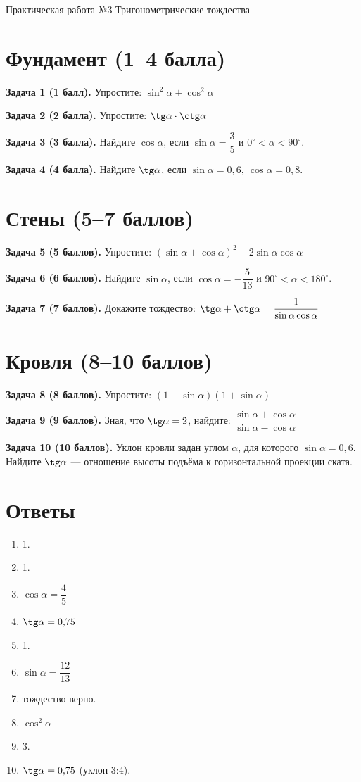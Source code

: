 \documentclass{umk-matematika}
\begin{document}
\maketitlepage
    {Практическая работа №3}
    {Тригонометрические тождества}
    {}

\section{Фундамент (1--4 балла)}

\textbf{Задача 1 (1 балл).} Упростите: $\sin^2 \alpha + \cos^2 \alpha$

\textbf{Задача 2 (2 балла).} Упростите: $\tg \alpha \cdot \ctg \alpha$

\textbf{Задача 3 (3 балла).} Найдите $\cos \alpha$, если $\sin \alpha = \dfrac{3}{5}$ и $0^\circ < \alpha < 90^\circ$.

\textbf{Задача 4 (4 балла).} Найдите $\tg \alpha$, если $\sin \alpha = 0{,}6,\ \cos \alpha = 0{,}8$.

\section{Стены (5--7 баллов)}

\textbf{Задача 5 (5 баллов).} Упростите: $(\sin \alpha + \cos \alpha)^2 - 2\sin \alpha \cos \alpha$

\textbf{Задача 6 (6 баллов).} Найдите $\sin \alpha$, если $\cos \alpha = -\dfrac{5}{13}$ и $90^\circ < \alpha < 180^\circ$.

\textbf{Задача 7 (7 баллов).} Докажите тождество: $\tg \alpha + \ctg \alpha = \dfrac{1}{\sin \alpha \cos \alpha}$

\section{Кровля (8--10 баллов)}

\textbf{Задача 8 (8 баллов).} Упростите: $(1 - \sin \alpha)(1 + \sin \alpha)$

\textbf{Задача 9 (9 баллов).} Зная, что $\tg \alpha = 2$, найдите: $\dfrac{\sin \alpha + \cos \alpha}{\sin \alpha - \cos \alpha}$

\textbf{Задача 10 (10 баллов).} Уклон кровли задан углом $\alpha$, для которого $\sin \alpha = 0{,}6$. Найдите $\tg \alpha$ — отношение высоты подъёма к горизонтальной проекции ската.

\newpage
\section*{Ответы}

\begin{enumerate}
  \item 1.
  \item 1.
  \item $\cos \alpha = \dfrac{4}{5}$
  \item $\tg \alpha = 0{,}75$
  \item 1.
  \item $\sin \alpha = \dfrac{12}{13}$
  \item тождество верно.
  \item $\cos^2 \alpha$
  \item 3.
  \item $\tg \alpha = 0{,}75$ (уклон 3:4).
\end{enumerate}
\end{document}
